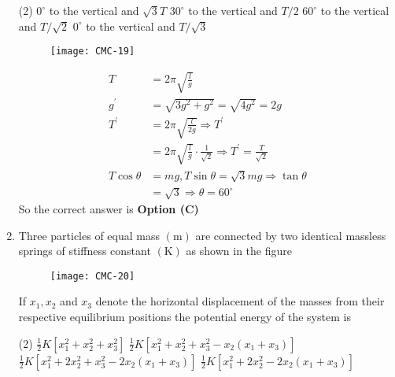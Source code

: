 \begin{enumerate}
{}
\begin{tasks}(2)
\task[\textbf{A.}]  $0^{\circ}$ to the vertical and $\sqrt{3} T$
\task[\textbf{B.}] $30^{\circ}$ to the vertical and $T / 2$
\task[\textbf{C.}] $60^{\circ}$ to the vertical and $T / \sqrt{2}$
\task[\textbf{D.}] $0^{\circ}$ to the vertical and $T / \sqrt{3}$
\end{tasks}
\begin{answer}
\begin{figure}[H]
	\centering
	\texttt{[image: CMC-19]}
\end{figure}
\begin{align*}
T&=2 \pi \sqrt{\frac{l}{g}}\\
g^{\prime}&=\sqrt{3 g^{2}+g^{2}}=\sqrt{4 g^{2}}=2 g\\
T^{\prime}&=2 \pi \sqrt{\frac{l}{2 g}} \Rightarrow T^{\prime}\\&=2 \pi \sqrt{\frac{l}{g}} \cdot \frac{1}{\sqrt{2}} \Rightarrow T^{\prime}=\frac{T}{\sqrt{2}}\\
T \cos \theta&=m g, T \sin \theta=\sqrt{3} m g \Rightarrow \tan \theta\\&=\sqrt{3} \Rightarrow \theta=60^{\circ}
\end{align*}
So the correct answer is \textbf{Option (C)}
\end{answer}
\item Three particles of equal mass $(\mathrm{m})$ are connected by two identical massless springs of stiffness constant $(\mathrm{K})$ as shown in the figure\\
\begin{figure}[H]
	\centering
	\texttt{[image: CMC-20]}
\end{figure}
If $x_{1}, x_{2}$ and $x_{3}$ denote the horizontal displacement of the masses from their respective equilibrium positions the potential energy of the system is
{}
\begin{tasks}(2)
\task[\textbf{A.}] $\frac{1}{2} K\left[x_{1}^{2}+x_{2}^{2}+x_{3}^{2}\right]$
\task[\textbf{B.}] $\frac{1}{2} K\left[x_{1}^{2}+x_{2}^{2}+x_{3}^{2}-x_{2}\left(x_{1}+x_{3}\right)\right]$
\task[\textbf{C.}] $\frac{1}{2} K\left[x_{1}^{2}+2 x_{2}^{2}+x_{3}^{2}-2 x_{2}\left(x_{1}+x_{3}\right)\right]$
\task[\textbf{D.}] $\frac{1}{2} K\left[x_{1}^{2}+2 x_{2}^{2}-2 x_{2}\left(x_{1}+x_{3}\right)\right]$
\end{tasks}
\begin{answer}
\begin{align*}

\end{align*}
\end{answer}
\end{enumerate}
